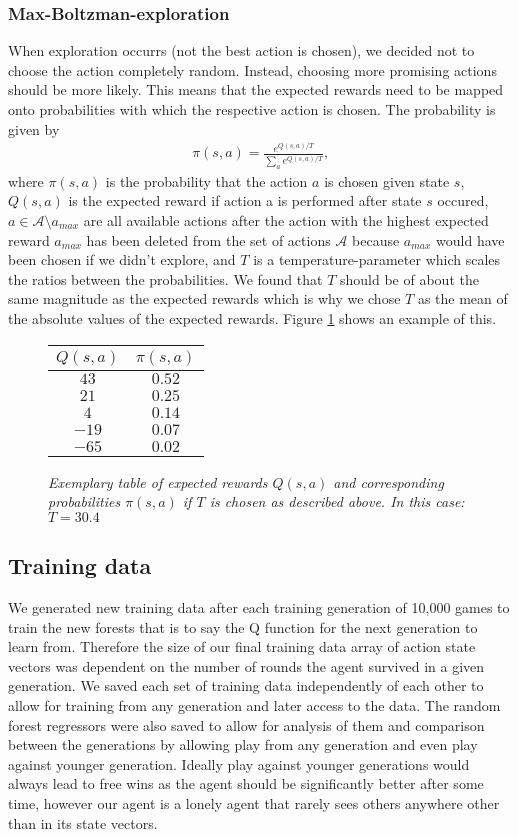 	\subsubsection{Max-Boltzman-exploration}
	When exploration occurrs (not the best action is chosen), we decided not to choose the action completely random. Instead, choosing more promising actions should be more likely. This means that the expected rewards need to be mapped onto probabilities with which the respective action is chosen. The probability is given by 
	\begin{align}
		\pi (s,a) = \frac{e^{Q(s,a)/T}}{\sum_{a} e^{Q(s,a)/T}}\text{,}
	\end{align}
	where $\pi (s,a)$ is the probability that the action $a$ is chosen given state $s$, $Q(s,a)$ is the expected reward if action a is performed after state $s$ occured, $a \in \mathcal{A}\setminus a_{max}$ are all available actions after the action with the highest expected reward $a_{max}$ has been deleted from the set of actions $\mathcal{A}$ because $a_{max}$ would have been chosen if we didn't explore, and $T$ is a temperature-parameter which scales the ratios between the probabilities. We found that $T$ should be of about the same magnitude as the expected rewards which is why we chose $T$ as the mean of the absolute values of the expected rewards. Figure \ref{MB_table} shows an example of this.
	\begin{figure}[h]
		\centering
		\begin{tabular}{c|c}
			$Q(s,a)$ & $\pi (s,a)$\\
			\midrule
			$43$ & $0.52$\\
			$21$ & $0.25$\\
			$4$ & $0.14$\\
			$-19$ & $0.07$\\
			$-65$ & $0.02$
		\end{tabular}
	\caption{\textit{Exemplary table of expected rewards $Q(s,a)$ and corresponding probabilities $\pi (s,a)$ if $T$ is chosen as described above. In this case: $T=30.4$}}
	\label{MB_table}
	\end{figure}
	\subsection{Training data}
	We generated new training data after each training generation of 10,000 games to train the new forests that is to say the Q function for the next generation to learn from. Therefore the size of our final training data array of action state vectors was dependent on the number of rounds the agent survived in a given generation. We saved each set of training data independently of each other to allow for training from any generation and later access to the data. The random forest regressors were also saved to allow for analysis of them and comparison between the generations by allowing play from any generation and even play against younger generation. Ideally play against younger generations would always lead to free wins as the agent should be significantly better after some time, however our agent is a lonely agent that rarely sees others anywhere other than in its state vectors.
